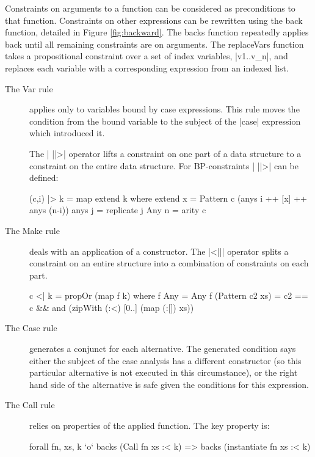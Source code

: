 \documentclass[preprint]{sigplanconf}
\newcommand{\C}[1]{\textsf{#1}}
\begin{document}
Constraints on arguments to a function can be considered as preconditions to that function. Constraints on other expressions can be rewritten using the \C{back} function, detailed in Figure \ref{fig:backward}. The \C{backs} function repeatedly applies \C{back} until all remaining constraints are on arguments. The \C{replaceVars} function takes a propositional constraint over a set of index variables, |v1..v_n|, and replaces each variable with a corresponding expression from an indexed list.

\begin{description}

\item[The \C{Var} rule] applies only to variables bound by case expressions. This rule moves the condition from the bound variable to the subject of the |case| expression which introduced it.

    The | ||>| operator lifts a constraint on one part of a data structure to a constraint on the entire data structure. For BP-constraints | ||>| can be defined:

\begin{code}
(c,i) |> k = map extend k
    where
    extend x = Pattern c (anys i ++ [x] ++ anys (n-i))
    anys j = replicate j Any
    n = arity c
\end{code}

\item[The \C{Make} rule] deals with an application of a constructor. The |<||| operator splits a constraint on an entire structure into a combination of constraints on each part.

\begin{code}
c <| k = propOr (map f k)
    where
    f Any = Any
    f (Pattern c2 xs) = c2 == c &&
        and (zipWith (:<) [0..] (map (:[]) xs))
\end{code}

\item[The \C{Case} rule] generates a conjunct for each alternative. The generated condition says either the subject of the case analysis has a different constructor (so this particular alternative is not executed in this circumstance), or the right hand side of the alternative is safe given the conditions for this expression.

\item[The \C{Call} rule] relies on properties of the applied function. The key property is:

    \begin{code}
    forall fn, xs, k `o`  backs (Call fn xs :< k) =>
                          backs (instantiate fn xs :< k)
    \end{code}


\end{description}
\end{document}
